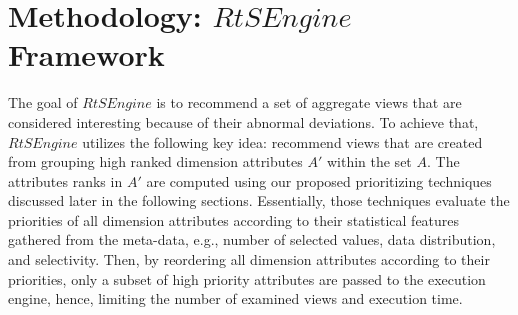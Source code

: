 \section{Methodology: $RtSEngine$ Framework}
\label{sec:method}
%
%
The goal of $RtSEngine$ is to recommend a set of aggregate views that are considered interesting because of their abnormal deviations.
%
% 
To achieve that, $RtSEngine$ utilizes the following key idea: recommend views that are created from grouping high ranked dimension attributes $A'$ within the set $A$.
%
The attributes ranks in $A'$ are computed using our proposed prioritizing techniques discussed later in the following sections.
%
Essentially, those techniques evaluate the priorities of all dimension attributes according to their statistical features gathered from the meta-data, e.g., number of selected values, data distribution, and selectivity.
% 
Then, by reordering all dimension attributes according to their priorities, only a subset of high priority attributes are passed to the execution engine, hence, limiting the number of examined views and execution time.  

